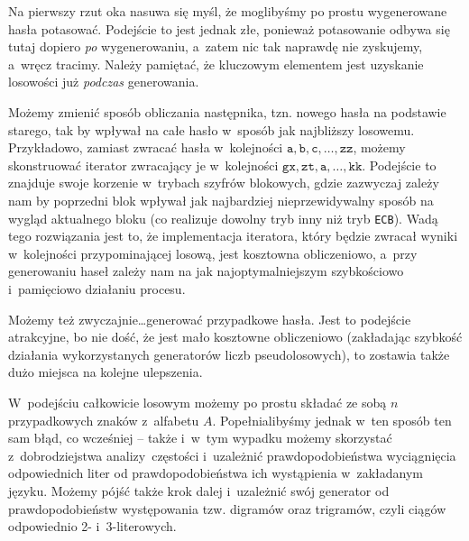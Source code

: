 \documentclass[12pt,a4paper,twoside]{article}
\begin{document}
\begin{myenumerate}
    \item Na pierwszy rzut oka nasuwa się myśl, że moglibyśmy po prostu
    wygenerowane hasła potasować. Podejście to jest jednak złe, ponieważ
    potasowanie odbywa się tutaj dopiero \emph{po} wygenerowaniu, a~zatem nic
    tak naprawdę nie zyskujemy, a~wręcz tracimy. Należy pamiętać, że kluczowym
    elementem jest uzyskanie losowości już \emph{podczas} generowania.

    \item Możemy zmienić sposób obliczania następnika, tzn. nowego hasła na
    podstawie starego, tak by wpływał na całe hasło w~sposób jak najbliższy
    losowemu. Przykładowo, zamiast zwracać hasła w~kolejności $\mathtt{a},
    \mathtt{b}, \mathtt{c}, \ldots, \mathtt{zz}$, możemy skonstruować iterator
    zwracający je w~kolejności $\mathtt{gx}, \mathtt{zt}, \mathtt{a}, \ldots,
    \mathtt{kk}$. Podejście to znajduje swoje korzenie w~trybach szyfrów
    blokowych, gdzie zazwyczaj zależy nam by poprzedni blok wpływał jak
    najbardziej nieprzewidywalny sposób na wygląd aktualnego bloku (co
    realizuje dowolny tryb inny niż tryb \texttt{ECB}). Wadą tego rozwiązania
    jest to, że implementacja iteratora, który będzie zwracał wyniki
    w~kolejności przypominającej losową, jest kosztowna obliczeniowo, a~przy
    generowaniu haseł zależy nam na jak najoptymalniejszym szybkościowo
    i~pamięciowo działaniu procesu.

    \item Możemy też zwyczajnie\ldots generować przypadkowe hasła. Jest to
    podejście atrakcyjne, bo nie dość, że jest mało kosztowne obliczeniowo
    (zakładając szybkość działania wykorzystanych generatorów liczb
    pseudolosowych), to zostawia także dużo miejsca na kolejne ulepszenia.

    W~podejściu całkowicie losowym możemy po prostu składać ze sobą $n$
    przypadkowych znaków z~alfabetu $A$. Popełnialibyśmy jednak w~ten sposób
    ten sam błąd, co wcześniej -- także i~w~tym wypadku możemy skorzystać
    z~dobrodziejstwa analizy~częstości i~uzależnić prawdopodobieństwa
    wyciągnięcia odpowiednich liter od prawdopodobieństwa ich wystąpienia
    w~zakładanym języku. Możemy pójść także krok dalej i~uzależnić swój
    generator od prawdopodobieństw występowania tzw. digramów oraz trigramów,
    czyli ciągów odpowiednio 2- i~3-literowych.


\end{myenumerate}
\end{document}
